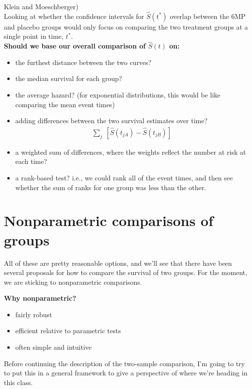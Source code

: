 \documentclass[11pt,slidesonly,semrot,portrait,palatino]{book}
\begin{document}
Klein and Moeschberger)
\\[2ex]
Looking at whether the confidence intervals
for $\hat{S}(t^{*})$ overlap between the 6MP and placebo groups
would only focus on comparing the two treatment
groups at a single point in time, $t^{*}$.
\\[2ex]
{\bf Should we base our overall comparison of $\hat{S}(t)$ on:}
\begin{itemize}
\item the furthest distance between the two curves?
\item the median survival for each group?
\item the average hazard? (for exponential distributions, this would
be like comparing the mean event times)
\item adding differences between the two survival estimates
over time?
\begin{eqnarray*}
\sum_j \; \left[\hat{S}(t_{jA}) - \hat{S}(t_{jB})\right]
\end{eqnarray*}
\item a weighted sum of differences, where the weights reflect the
number at risk at each time?
\item a rank-based test?  i.e., we could rank all of the event times,
and then see whether the sum of ranks for one group was less than the
other.
\end{itemize}
\section{Nonparametric comparisons of groups}
All of these are pretty reasonable options, and we'll see that
there have been several proposals for how to compare the survival
of two groups.  For the moment, we are sticking to nonparametric
comparisons.
\\[2ex]
{\bf Why nonparametric?
\begin{itemize}
\item fairly robust
\item efficient relative to parametric tests
\item often simple and intuitive
\end{itemize}}
Before continuing the description of the two-sample comparison, I'm
going to try to put this in a general framework to give a perspective
of where we're heading in this class.
\end{document}
